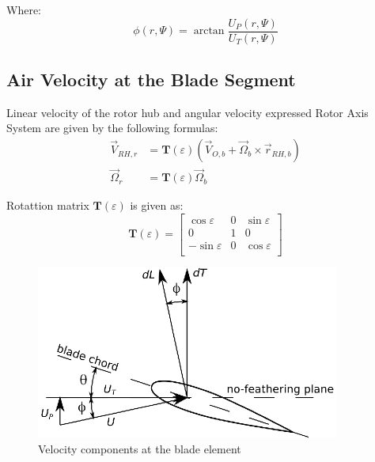 Where:
\begin{equation}
  \phi \left( r , \Psi \right)
  =
  \arctan \frac{ U_P \left( r, \Psi \right) }{ U_T \left( r, \Psi \right) }
\end{equation}

\subsection{Air Velocity at the Blade Segment}

Linear velocity of the rotor hub and angular velocity expressed Rotor Axis System are given by the following formulas: \cite{Stepniewski1984, Bramwell2001}
\begin{align}
  {\vec V}_{RH,r}
  &=
  {\boldsymbol T} \left( \varepsilon \right)
  \left(
    {\vec V}_{O,b} + {\vec \Omega}_b \times {\vec r}_{RH,b}
  \right) \\
  {\vec \Omega}_r
  &=
  {\boldsymbol T} \left( \varepsilon \right)
  {\vec \Omega}_b
\end{align}

Rotattion matrix ${\boldsymbol T} \left( \varepsilon \right)$ is given as:
\begin{equation}
  {\boldsymbol T} \left( \varepsilon \right)
  =
  \left[
    \begin{matrix}
       \cos \varepsilon & 0 & \sin \varepsilon \\
                        0 & 1 &              0 \\
      -\sin \varepsilon & 0 & \cos \varepsilon \\
    \end{matrix}
  \right]
\end{equation}

\begin{figure}
  \centering
  \includegraphics[width=100mm]{images/blade_element_theory_02.eps}
  \caption{Velocity components at the blade element}
\end{figure}

